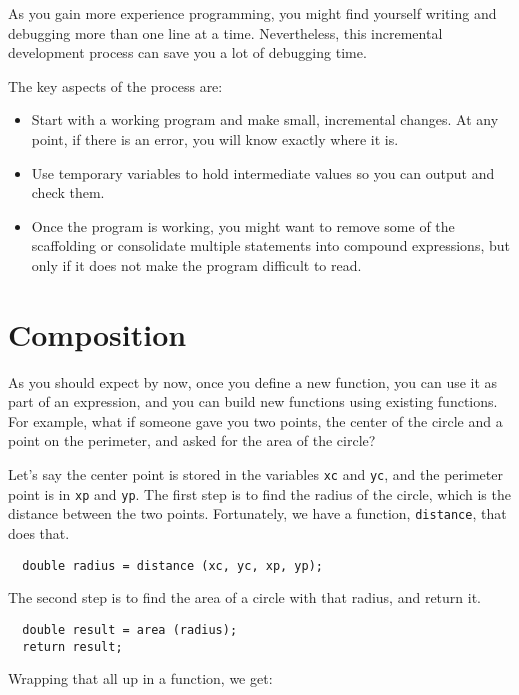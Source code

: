 As you gain more experience programming, you might find yourself
writing and debugging more than one line at a time.  Nevertheless,
this incremental development process can save you a lot of
debugging time.

The key aspects of the process are:

\begin{itemize}

\item Start with a working program and make small, incremental
changes.  At any point, if there is an error, you will know
exactly where it is.

\item Use temporary variables to hold intermediate values so
you can output and check them.

\item Once the program is working, you might want to remove
some of the scaffolding or consolidate multiple statements into
compound expressions, but only if it does not make the program
difficult to read.

\end{itemize}

\section{Composition}

As you should expect by now, once you define a new function,
you can use it as part of an expression, and you can build
new functions using existing functions.  For example, what if someone
gave you two points, the center of the circle and a point on
the perimeter, and asked for the area of the circle?

Let's say the center point is stored in the variables {\tt xc}
and {\tt yc}, and the perimeter point is in {\tt xp} and
{\tt yp}.  The first step is to find the radius of the circle, which
is the distance between the two points.  Fortunately, we have
a function, {\tt distance}, that does that.

\begin{verbatim}
  double radius = distance (xc, yc, xp, yp);
\end{verbatim}
%
The second step is to find the area of a circle with that
radius, and return it.

\begin{verbatim}
  double result = area (radius);
  return result;
\end{verbatim}
%
Wrapping that all up in a function, we get:

